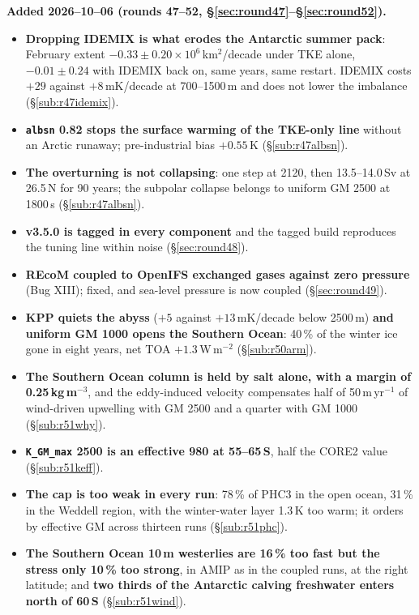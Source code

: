 \documentclass[10pt]{article}
\begin{document}
\textbf{Added 2026--10--06 (rounds 47--52, \S\ref{sec:round47}--\S\ref{sec:round52}).}
\begin{itemize}\itemsep2pt
\item \textbf{Dropping IDEMIX is what erodes the Antarctic summer pack}: February extent
$-0.33\pm0.20\times10^6$\,km$^2$/decade under TKE alone, $-0.01\pm0.24$ with IDEMIX back on, same
years, same restart. IDEMIX costs $+29$ against $+8$\,mK/decade at 700--1500\,m and does not lower the
imbalance (\S\ref{sub:r47idemix}).
\item \textbf{\texttt{albsn} 0.82 stops the surface warming of the TKE-only line} without an Arctic
runaway; pre-industrial bias $+0.55$\,K (\S\ref{sub:r47albsn}).
\item \textbf{The overturning is not collapsing}: one step at 2120, then 13.5--14.0\,Sv at 26.5\,N
for 90 years; the subpolar collapse belongs to uniform GM 2500 at 1800\,s (\S\ref{sub:r47albsn}).
\item \textbf{v3.5.0 is tagged in every component} and the tagged build reproduces the tuning line
within noise (\S\ref{sec:round48}).
\item \textbf{REcoM coupled to OpenIFS exchanged gases against zero pressure} (Bug XIII); fixed, and
sea-level pressure is now coupled (\S\ref{sec:round49}).
\item \textbf{KPP quiets the abyss} ($+5$ against $+13$\,mK/decade below 2500\,m) \textbf{and uniform
GM 1000 opens the Southern Ocean}: 40\,\% of the winter ice gone in eight years, net TOA
$+1.3$\,W\,m$^{-2}$ (\S\ref{sub:r50arm}).
\item \textbf{The Southern Ocean column is held by salt alone, with a margin of
0.25\,kg\,m$^{-3}$}, and the eddy-induced velocity compensates half of 50\,m\,yr$^{-1}$ of wind-driven
upwelling with GM 2500 and a quarter with GM 1000 (\S\ref{sub:r51why}).
\item \textbf{\texttt{K\_GM\_max} 2500 is an effective 980 at 55--65\,S}, half the CORE2 value
(\S\ref{sub:r51keff}).
\item \textbf{The cap is too weak in every run}: 78\,\% of PHC3 in the open ocean, 31\,\% in the
Weddell region, with the winter-water layer 1.3\,K too warm; it orders by effective GM across thirteen
runs (\S\ref{sub:r51phc}).
\item \textbf{The Southern Ocean 10\,m westerlies are 16\,\% too fast but the stress only 10\,\% too
strong}, in AMIP as in the coupled runs, at the right latitude; and \textbf{two thirds of the
Antarctic calving freshwater enters north of 60\,S}
(\S\ref{sub:r51wind}).
\end{itemize}
\end{document}
